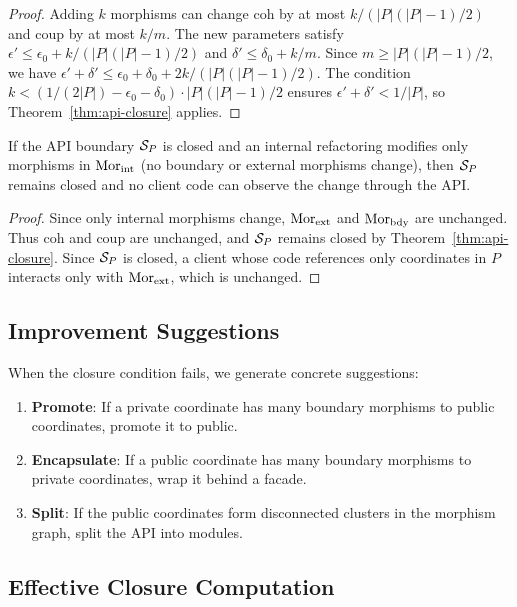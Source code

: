 \documentclass[11pt]{article}
\newcommand{\CohIndex}{\mathrm{coh}}
\newcommand{\CoupIndex}{\mathrm{coup}}
\begin{document}
\begin{proof}
Adding $k$ morphisms can change $\CohIndex$ by at most
$k/(|P|(|P|-1)/2)$ and $\CoupIndex$ by at most $k/m$.  The new
parameters satisfy $\epsilon' \leq \epsilon_0 + k/(|P|(|P|-1)/2)$ and
$\delta' \leq \delta_0 + k/m$.  Since $m \geq |P|(|P|-1)/2$, we have
$\epsilon' + \delta' \leq \epsilon_0 + \delta_0 + 2k/(|P|(|P|-1)/2)$.
The condition $k < (1/(2|P|) - \epsilon_0 - \delta_0) \cdot |P|(|P|-1)/2$
ensures $\epsilon' + \delta' < 1/|P|$, so
Theorem~\ref{thm:api-closure} applies.
\end{proof}

\begin{corollary}\label{cor:evolution-safety}
If the API boundary $\mathcal{S}_P$ is closed and an internal refactoring
modifies only morphisms in $\mathrm{Mor}_{\mathrm{int}}$ (no boundary or
external morphisms change), then $\mathcal{S}_P$ remains closed and no client
code can observe the change through the API.
\end{corollary}

\begin{proof}
Since only internal morphisms change, $\mathrm{Mor}_{\mathrm{ext}}$ and
$\mathrm{Mor}_{\mathrm{bdy}}$ are unchanged.  Thus $\CohIndex$ and $\CoupIndex$
are unchanged, and $\mathcal{S}_P$ remains closed by
Theorem~\ref{thm:api-closure}.  Since $\mathcal{S}_P$ is closed, a client
whose code references only coordinates in $P$ interacts only with
$\mathrm{Mor}_{\mathrm{ext}}$, which is unchanged.
\end{proof}

\subsection{Improvement Suggestions}
When the closure condition fails, we generate concrete suggestions:
\begin{enumerate}[noitemsep]
  \item \textbf{Promote}: If a private coordinate has many boundary
        morphisms to public coordinates, promote it to public.
  \item \textbf{Encapsulate}: If a public coordinate has many boundary
        morphisms to private coordinates, wrap it behind a facade.
  \item \textbf{Split}: If the public coordinates form disconnected
        clusters in the morphism graph, split the API into modules.
\end{enumerate}

\subsection{Effective Closure Computation}\label{sec:closure-algo}
\end{document}
